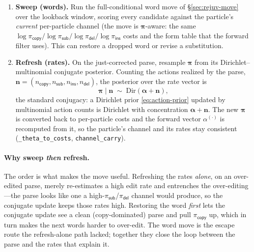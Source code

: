 \documentclass[11pt]{article}
\providecommand{\given}{\mid}
\providecommand{\copyact}{\textsf{copy}}
\providecommand{\subact}{\textsf{sub}}
\providecommand{\insact}{\textsf{ins}}
\providecommand{\delact}{\textsf{del}}
\providecommand{\code}[1]{\texttt{#1}}
\providecommand{\actdist}{\bm{\pi}}            %
\providecommand{\pcopy}{\pi_{\copyact}}
\providecommand{\psub}{\pi_{\subact}}
\providecommand{\pins}{\pi_{\insact}}
\providecommand{\pdel}{\pi_{\delact}}
\providecommand{\Dir}{\mathrm{Dir}}
\begin{document}
\begin{enumerate}[leftmargin=1.8em,itemsep=2pt]
\item \textbf{Sweep (words).} Run the full-conditional word move of \S\ref{sec:rejuv-move} over the lookback window, scoring every candidate against the particle's \emph{current} per-particle channel (the move is $\actdist$-aware: the same $\log\pcopy/\log\psub/\log\pdel/\log\pins$ costs and the form table that the forward filter uses). This can restore a dropped word or revise a substitution.
\item \textbf{Refresh (rates).} On the just-corrected parse, resample $\actdist$ from its Dirichlet--multinomial conjugate posterior. Counting the actions realized by the parse, $\bm n = (n_{\copyact}, n_{\subact}, n_{\insact}, n_{\delact})$, the posterior over the rate vector is
        \begin{equation}\label{eq:theta-refresh}
          \actdist \given \bm n \;\sim\; \Dir(\bm\alpha + \bm n),
        \end{equation}
the standard conjugacy: a Dirichlet prior \eqref{eq:action-prior} updated by multinomial action counts is Dirichlet with concentration $\bm\alpha + \bm n$. The new $\actdist$ is converted back to per-particle costs and the forward vector $\alpha^{(\cdot)}$ is recomputed from it, so the particle's channel and its rates stay consistent (\code{\_theta\_to\_costs}, \code{channel\_carry}).
\end{enumerate}

\paragraph{Why sweep \emph{then} refresh.} The order is what makes the move useful. Refreshing the rates \emph{alone}, on an over-edited parse, merely re-estimates a high edit rate and entrenches the over-editing---the parse looks like one a high-$\psub$/$\pdel$ channel would produce, so the conjugate update keeps those rates high. Restoring the word \emph{first} lets the conjugate update see a clean (copy-dominated) parse and pull $\pcopy$ up, which in turn makes the next words harder to over-edit. The word move is the escape route the refresh-alone path lacked; together they close the loop between the parse and the rates that explain it.
\end{document}
